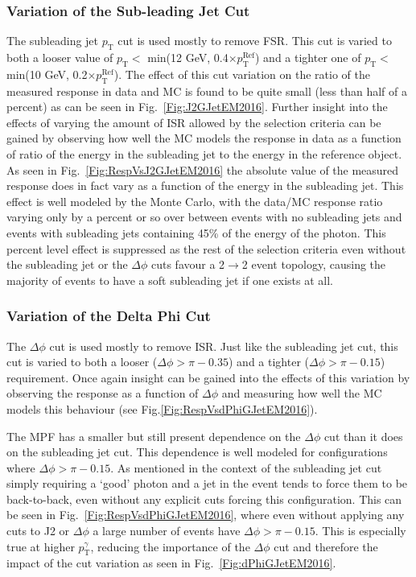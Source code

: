 \subsubsection{Variation of the Sub-leading Jet Cut}
The subleading jet $p_{\mathrm T}$ cut is used mostly to remove FSR.
This cut is varied to both a looser value of $p_{\mathrm T}<$ min(12 GeV, 0.4$\times p_{\mathrm T}^{\mathrm {Ref}}$) and a tighter one of $p_{\mathrm T}<$ min(10 GeV, 0.2$\times p_{\mathrm T}^{\mathrm {Ref}}$).
The effect of this cut variation on the ratio of the measured response in data and MC is found to be quite small (less than half of a percent) as can be seen in Fig.~\ref{Fig:J2GJetEM2016}.
Further insight into the effects of varying the amount of ISR allowed by the selection criteria can be gained by observing how well the MC models the response in data as a function 
of ratio of the energy in the subleading jet to the energy in the reference object.
As seen in Fig.~\ref{Fig:RespVsJ2GJetEM2016} the absolute value of the measured response does in fact vary as a function of the energy in the subleading jet.
This effect is well modeled by the Monte Carlo, with the data/MC response ratio varying only by a percent or so over between events with no subleading jets and events with subleading jets containing 45\% of the energy of the photon.
This percent level effect is suppressed as the rest of the selection criteria even without the subleading jet or the $\Delta\phi$ cuts favour a 2$\rightarrow$2 event topology, causing the majority of events to have a soft subleading jet if one exists at all.


\subsubsection{Variation of the Delta Phi Cut}
The $\Delta\phi$ cut is used mostly to remove ISR.
Just like the subleading jet cut, this cut is varied to both a looser ($\Delta\phi>\pi-0.35$) and a tighter ($\Delta\phi>\pi-0.15$) requirement.
Once again insight can be gained into the effects of this variation by observing the response as a function of $\Delta\phi$ and measuring how well the MC models this behaviour (see Fig.\ref{Fig:RespVsdPhiGJetEM2016}).  

The MPF has a smaller but still present dependence on the $\Delta\phi$ cut than it does on the subleading jet cut.  
This dependence is well modeled for configurations where $\Delta\phi>\pi-0.15$.  
As mentioned in the context of the subleading jet cut simply requiring a `good' photon and a jet in the event tends to force them to be back-to-back, even without any explicit cuts forcing this configuration.  
This can be seen in Fig.~\ref{Fig:RespVsdPhiGJetEM2016}, where even without applying any cuts to J2 or $\Delta\phi$ a large number of events have $\Delta\phi>\pi-0.15$.  
This is especially true at higher $p_{\mathrm T}^{\gamma}$, reducing the importance of the $\Delta\phi$ cut and therefore the impact of the cut variation as seen in Fig.~\ref{Fig:dPhiGJetEM2016}.  

